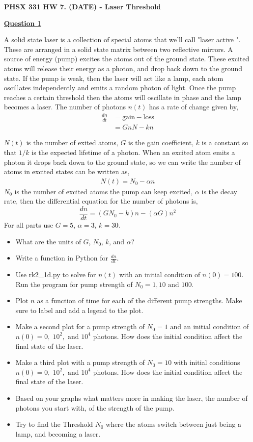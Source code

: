 \documentclass[]{letter}
\begin{document}
 
\textbf{\Large{PHSX 331 HW 7. (DATE) - Laser Threshold}}
 
\hrulefill
 
\textbf{\underline{Question 1}} 

 A solid state laser is a collection of special atoms that we'll call "laser active ". These are arranged in a solid state matrix between two reflective mirrors. A source of energy (pump) excites the atoms out of the ground state. These excited atoms will release their energy as a photon, and drop back down to the ground state. If the pump is weak, then the laser will act like a lamp, each atom oscillates independently and emits a random photon of light. Once the pump reaches a certain threshold then the atoms will oscillate in phase and the lamp becomes a laser. The number of photons $n(t)$ has a rate of change given by,
\begin{align}
	 \frac{dn}{dt} &= \text{gain} - \text{loss} \\
		&= GnN - kn
\end{align}

$N(t)$ is the number of exited atoms, $G$ is the gain coefficient, $k$ is a constant so that $1/k$ is the expected lifetime of a photon. When an excited atom emits a photon it drops back down to the ground state, so we can write the number of atoms in excited states can be written as,
\begin{align}
N(t) = N_{0} - \alpha n
\end{align}
$N_{0}$ is the number of excited atoms the pump can keep excited, $\alpha$ is the decay rate, then the differential equation for the number of photons is,
\begin{equation}
	\frac{dn}{dt} = (GN_{0} - k )n - (\alpha G) n^2
\end{equation}
For all parts use $G = 5$, $\alpha = 3$, $k = 30$.
\begin{itemize}
	\item What are the units of $G$, $N_0$, $k$, and $\alpha$?
	\item Write a function in Python for $\frac{dn}{dt}$.
	\item Use rk2\_1d.py to solve for $n(t)$ with an initial condition of $n(0) = 100$. Run the program for pump strength of $N_0 = 1, 10 \text{ and } 100$. 
	\item Plot $n$ as a function of time for each of the different pump strengths. Make sure to label and add a legend to the plot.
	\item Make a second plot for a pump strength of $N_0 = 1$ and an initial condition of $n(0) = 0, \; 10^2, \text{ and } 10^4$ photons. How does the initial condition affect the final state of the laser.
	\item Make a third plot with a pump strength of $N_0 = 10$ with initial conditions $n(0) = 0, \; 10^2, \text{ and } 10^4$ photons. How does the initial condition affect the final state of the laser.
	\item Based on your graphs what matters more in making the laser, the number of photons you start with, of the strength of the pump. 
	\item Try to find the Threshold $N_0$ where the atoms switch between just being a lamp, and becoming a laser. 
\end{itemize}
\end{document}
